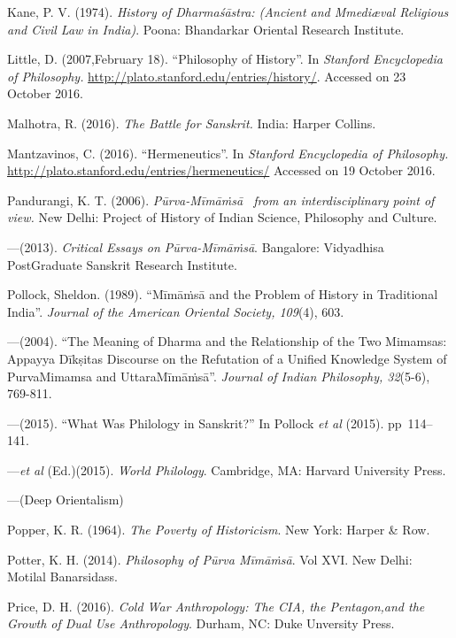 \begin{thebibliography}{99}
  Kane, P. V. (1974). \textit{History of Dharmaśāstra: (Ancient and Mmediæval Religious and Civil Law in India)}. Poona: Bhandarkar Oriental Research Institute.

  Little, D. (2007,February 18). “Philosophy of History”. In \textit{Stanford Encyclopedia of Philosophy.} \url{http://plato.stanford.edu/entries/history/}. Accessed on 23 October 2016.

  Malhotra, R. (2016). \textit{The Battle for Sanskrit.} India: Harper Collins.

  Mantzavinos, C. (2016). “Hermeneutics”. In \textit{Stanford Encyclopedia of Philosophy.} \url{http://plato.stanford.edu/entries/hermeneutics/} Accessed on 19 October 2016.

  Pandurangi, K. T. (2006). \textit{Pūrva-Mīmāṁsā  from an interdisciplinary point of view.} New Delhi: Project of History of Indian Science, Philosophy and Culture.

  ---(2013). \textit{Critical Essays on Pūrva-Mīmāṁsā}. Bangalore: Vidyadhisa PostGraduate Sanskrit Research Institute.

  Pollock, Sheldon. (1989). “Mīmāṁsā and the Problem of History in Traditional India”. \textit{Journal of the American Oriental Society, 109}(4), 603.

  ---(2004). “The Meaning of Dharma and the Relationship of the Two Mimamsas: Appayya Dīkṣitas Discourse on the Refutation of a Unified Knowledge System of PurvaMimamsa and UttaraMīmāṁsā”. \textit{Journal of Indian Philosophy, 32}(5-6), 769-811.

  ---(2015). “What Was Philology in Sanskrit?” In Pollock \textit{et al} (2015). pp~114--141.

  ---\textit{et al} (Ed.)(2015). \textit{World Philology}. Cambridge, MA: Harvard University Press.

  ---(Deep Orientalism)

  Popper, K. R. (1964). \textit{The Poverty of Historicism}. New York: Harper \& Row.

  Potter, K. H. (2014). \textit{Philosophy of Pūrva Mīmāṁsā}. Vol XVI. New Delhi: Motilal Banarsidass.

  Price, D. H. (2016). \textit{Cold War Anthropology: The CIA, the Pentagon,and the Growth of Dual Use Anthropology}. Durham, NC: Duke Unversity Press.


\end{thebibliography}
